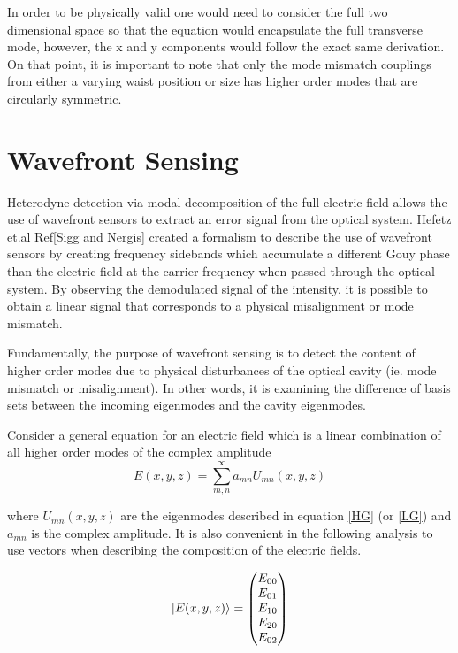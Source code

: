 \documentclass[oneside]{book}
\begin{document}
		 In order to be physically valid one would need to consider the full two dimensional space so that the equation would encapsulate the full transverse mode, however, the x and y components would follow the exact same derivation. On that point, it is important to note that only the mode mismatch couplings from either a varying waist position or size has higher order modes that are circularly symmetric.
		
		
		
		
		\section{Wavefront Sensing}\label{WFS}
		Heterodyne detection via modal decomposition of the full electric field allows the use of wavefront sensors to extract an error signal from the optical system.  Hefetz et.al Ref[Sigg and Nergis] created a formalism to describe the use of wavefront sensors by creating frequency sidebands which accumulate a different Gouy phase than the electric field at the carrier frequency when passed through the optical system.  By observing the demodulated signal of the intensity, it is possible to obtain a linear signal that corresponds to a physical misalignment or mode mismatch.
		
		Fundamentally, the purpose of wavefront sensing is to detect the content of higher order modes due to physical disturbances of the optical cavity (ie. mode mismatch or misalignment).  In other words, it is examining the difference of basis sets between the incoming eigenmodes and the cavity eigenmodes.
		
		Consider a general equation for an electric field which is a linear combination of all higher order modes of the complex amplitude
		\begin{equation}
		E(x,y,z) = \sum\limits_{m,n}^{\infty} a_{mn} U_{mn}(x,y,z)
		\end{equation}
		
		where $ U_{mn}(x,y,z)$ are the eigenmodes described in equation \ref{HG} (or \ref{LG}) and $a_{mn}$ is the complex amplitude.  It is also convenient in the following analysis to use vectors when describing the composition of the electric fields.
		
		\begin{equation}
		\ket{E(x,y,z)} = \begin{pmatrix} E_{00} 
		\\ E_{01}
		\\E_{10}
		\\E_{20}
		\\E_{02}
		\end{pmatrix}
		\end{equation}
\end{document}
